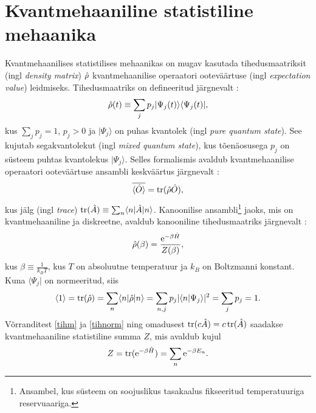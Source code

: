 \documentclass{trkut}%
\DeclareMathOperator{\tr}{tr}
\renewcommand\bra[1]{{\langle{#1}|}}
\renewcommand\ket[1]{{|{#1}\rangle}}
\renewcommand\braket[1]{\langle{#1}\rangle}
\begin{document}
\section{Kvantmehaaniline statistiline mehaanika}

Kvantmehaanilises statistilises mehaanikas on mugav kasutada tihedusmaatriksit (ingl \textit{density matrix}) $\op{\rho}$ kvantmehaanilise operaatori ooteväärtuse (ingl \textit{expectation value}) leidmiseks.
Tihedusmaatriks on defineeritud järgnevalt \parencite[172]{kardar07}:
\begin{equation}
    \op{\rho}(t) \equiv \sum_j p_j \ket{\Psi_j(t)} \bra{\Psi_j(t)},
\end{equation}
kus $\sum_j p_j=1$, $p_j > 0$ ja $\ket{\Psi_j}$ on puhas kvantolek (ingl \textit{pure quantum state}).
See kujutab segakvantolekut (ingl \textit{mixed quantum state}), kus tõenäosusega $p_j$ on süsteem puhtas kvantolekus $\ket{\Psi_j}$.
Selles formalismis avaldub kvantmehaanilise operaatori ooteväärtuse ansambli keskväärtus järgnevalt \parencite[172]{kardar07}:
\begin{equation}
    \overline{\braket{\op{O}}}=\tr(\op{\rho}\op{O}),
    \label{ootev}
\end{equation}
kus jälg (ingl \textit{trace}) $\tr(\op{A}) \equiv \sum_n \braket{n|\op{A}|n}$. %
Kanoonilise ansambli\footnote{Ansambel, kus süsteem on soojuslikus tasakaalus fikseeritud temperatuuriga reservuaariga.} jaoks, mis on kvantmehaaniline ja diskreetne, avaldub kanooniline tihedusmaatriks järgnevalt \parencite[174]{kardar07}:
\begin{equation}
    \op{\rho}(\beta) = \frac{\mathrm{e}^{-\beta \op{H}}}{Z(\beta)},
    \label{tihm}
\end{equation}
kus $\beta \equiv \frac{1}{k_B T}$, kus $T$ on absoluutne temperatuur ja $k_B$ on Boltzmanni konstant.
Kuna $\bra{\Psi_j}$ on normeeritud, siis
\begin{equation}
    \braket{1}=\tr(\op{\rho})=\sum_n \braket{n|\op{\rho}|n}=\sum_{n, j} p_j |\braket{n| \Psi_j}|^2=\sum_j p_j=1.
    \label{tihnorm}
\end{equation}
Võrranditest \eqref{tihm} ja \eqref{tihnorm} ning omadusest $\tr(c\op{A})=c\tr(\op{A})$ saadakse kvantmehaaniline statistiline summa $Z$, mis avaldub kujul
\begin{equation}
    Z=\tr(\mathrm{e}^{-\beta \op{H}})=\sum_n \mathrm{e}^{-\beta E_n}.
    \label{part}
\end{equation}
\end{document}
